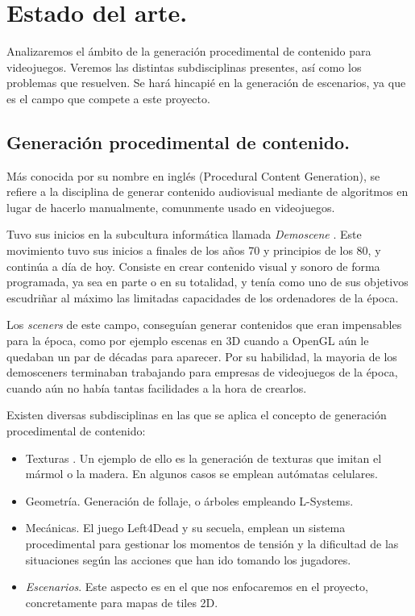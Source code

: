 \chapter{Estado del arte.}\label{cap:capitulo1}

Analizaremos el ámbito de la generación procedimental de contenido para videojuegos. Veremos las distintas subdisciplinas presentes, así como los problemas que resuelven. Se hará hincapié en la generación de escenarios, ya que es el campo que compete a este proyecto.

\section{Generación procedimental de contenido.}

Más conocida por su nombre en inglés (Procedural Content Generation), se refiere a la disciplina de generar contenido audiovisual mediante de algoritmos en lugar de hacerlo manualmente, comunmente usado en videojuegos.

Tuvo sus inicios en la subcultura informática llamada \emph{Demoscene} \cite{dmscn}. Este movimiento tuvo sus inicios a finales de los años 70 y principios de los 80, y continúa a día de hoy. Consiste en crear contenido visual y sonoro de forma programada, ya sea en parte o en su totalidad, y tenía como uno de sus objetivos escudriñar al máximo las limitadas capacidades de los ordenadores de la época.

Los \emph{sceners} de este campo, conseguían generar contenidos que eran impensables para la época, como por ejemplo escenas en 3D cuando a OpenGL aún le quedaban un par de décadas para aparecer. Por su habilidad, la mayoria de los demosceners terminaban trabajando para empresas de videojuegos de la época, cuando aún no había tantas facilidades a la hora de crearlos.

Existen diversas subdisciplinas en las que se aplica el concepto de generación procedimental de contenido:

\begin{itemize}
	\item Texturas \cite{texmodproc}. Un ejemplo de ello es la generación de texturas que imitan el mármol o la madera. En algunos casos se emplean autómatas celulares.
	\item Geometría. Generación de follaje, o árboles empleando L-Systems. \cite{texmodproc}
	\item Mecánicas. El juego Left4Dead y su secuela, emplean un sistema procedimental para gestionar los momentos de tensión y la dificultad de las situaciones según las acciones que han ido tomando los jugadores.
	\item \emph{Escenarios}. Este aspecto es en el que nos enfocaremos en el proyecto, concretamente para mapas de tiles 2D.
\end{itemize}

